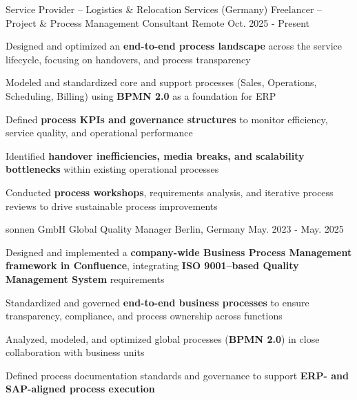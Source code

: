 \begin{cventries}

  \cventry
    {Service Provider – Logistics \& Relocation Services (Germany)} %
    {Freelancer – Project \& Process Management Consultant} %
    {Remote} %
    {Oct. 2025 - Present} %
    {
    \begin{cvitems}
        \item {Designed and optimized an \textbf{end-to-end process landscape} across the service lifecycle, focusing on handovers, and process transparency}
        \item {Modeled and standardized core and support processes (Sales, Operations, Scheduling, Billing) using \textbf{BPMN 2.0} as a foundation for ERP}
        \item {Defined \textbf{process KPIs and governance structures} to monitor efficiency, service quality, and operational performance}
        \item {Identified \textbf{handover inefficiencies, media breaks, and scalability bottlenecks} within existing operational processes}
        \item {Conducted \textbf{process workshops}, requirements analysis, and iterative process reviews to drive sustainable process improvements}
    \end{cvitems}
    }
  \cventry
    {sonnen GmbH} %
    {Global Quality Manager} %
    {Berlin, Germany} %
    {May. 2023 - May. 2025} %
    {
      \begin{cvitems}
        \item {Designed and implemented a \textbf{company-wide Business Process Management framework in Confluence}, integrating \textbf{ISO 9001–based Quality Management System} requirements}
        \item {Standardized and governed \textbf{end-to-end business processes} to ensure transparency, compliance, and process ownership across functions}
        \item {Analyzed, modeled, and optimized global processes (\textbf{BPMN 2.0}) in close collaboration with business units}
        \item {Defined process documentation standards and governance to support \textbf{ERP- and SAP-aligned process execution}}

\end{cvitems}}
\end{cventries}
